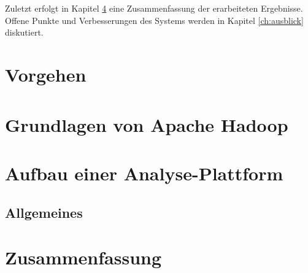 \documentclass[11pt,a4paper]{report} %
\begin{document}
\noindent
Zuletzt erfolgt in Kapitel \ref{ch:zusammenfassung} eine Zusammenfassung der erarbeiteten Ergebnisse. Offene Punkte und Verbesserungen des Systems werden in Kapitel \ref{ch:ausblick} diskutiert. 


\chapter{Vorgehen}
\label{ch:development_approach}




\chapter{Grundlagen von Apache Hadoop\textsuperscript{\textregistered}}
\label{ch:theory_hadoop}



\chapter{Aufbau einer Analyse-Plattform}
\label{ch:praxis_analysis}

\section{Allgemeines}






\chapter{Zusammenfassung}
\label{ch:zusammenfassung}

%
%
%
\end{document}
